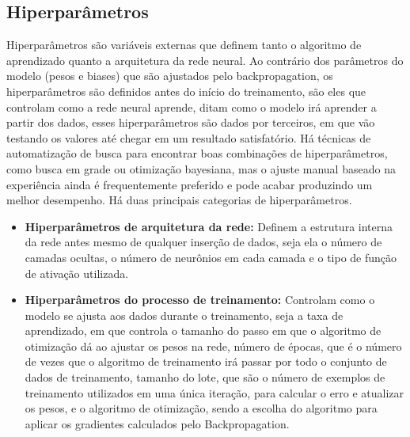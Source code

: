 \subsection{Hiperparâmetros}
Hiperparâmetros são variáveis externas que definem tanto o algoritmo de aprendizado quanto a arquitetura da rede neural. Ao contrário dos parâmetros do modelo (pesos e biases) que são ajustados pelo backpropagation, os hiperparâmetros são definidos antes do início do treinamento, são eles que controlam como a rede neural aprende, ditam como o modelo irá aprender a partir dos dados, esses hiperparâmetros são dados por terceiros, em que vão testando os valores até chegar em um resultado satisfatório. Há técnicas de automatização de busca para encontrar boas combinações de hiperparâmetros, como busca em grade ou otimização bayesiana, mas o ajuste manual baseado na experiência ainda é frequentemente preferido e pode acabar produzindo um melhor desempenho.
Há duas principais categorias de hiperparâmetros.
\begin{itemize}
    \item \textbf{Hiperparâmetros de arquitetura da rede:} Definem a estrutura interna da rede antes mesmo de qualquer inserção de dados, seja ela o número de camadas ocultas, o número de neurônios em cada camada e o tipo de função de ativação utilizada.
    \item \textbf{Hiperparâmetros do processo de treinamento:} Controlam como o modelo se ajusta aos dados durante o treinamento, seja a taxa de aprendizado, em que controla o tamanho do passo em que o algoritmo de otimização dá ao ajustar os pesos na rede, número de épocas, que é o número de vezes que o algoritmo de treinamento irá passar por todo o conjunto de dados de treinamento, tamanho do lote, que são o número de exemplos de treinamento utilizados em uma única iteração, para calcular o erro e atualizar os pesos, e o algoritmo de otimização, sendo a escolha do algoritmo para aplicar os gradientes calculados pelo Backpropagation.
\end{itemize}

